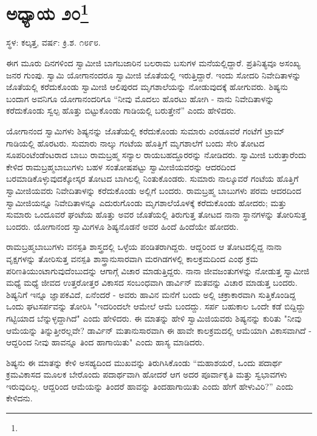 \newpage

\chapter[ಅಧ್ಯಾಯ ೨೦]{ಅಧ್ಯಾಯ ೨೦\protect\footnote{}}

\begin{center}
ಸ್ಥಳ: ಕಲ್ಕತ್ತ, ವರ್ಷ: ಕ್ರಿ.ಶ. ೧೮೯೮.
\end{center}

ಈಗ ಮೂರು ದಿನಗಳಿಂದ ಸ್ವಾಮೀಜಿ ಬಾಗಬಜಾರಿನ ಬಲರಾಮ ಬಸುಗಳ ಮನೆಯಲ್ಲಿದ್ದಾರೆ. ಪ್ರತಿನಿತ್ಯವೂ ಅಸಂಖ್ಯ ಜನರ ಗುಂಪು. ಸ್ವಾಮಿ ಯೋಗಾನಂದರೂ ಸ್ವಾಮೀಜಿ ಜೊತೆಯಲ್ಲಿ ಇರುತ್ತಿದ್ದಾರೆ. ಇಂದು ಸೋದರಿ ನಿವೇದಿತಾಳನ್ನು ಜೊತೆಯಲ್ಲಿ ಕರೆದುಕೊಂಡು ಸ್ವಾಮೀಜಿ ಆಲಿಪುರದ ಮೃಗಶಾಲೆಯನ್ನು ನೋಡುವುದಕ್ಕೆ ಹೋಗುವರು. ಶಿಷ್ಯನು ಬಂದಾಗ ಅವನಿಗೂ ಯೋಗಾನಂದರಿಗೂ “ನೀವು ಮೊದಲು ಹೊರಟು ಹೋಗಿ - ನಾನು ನಿವೇದಿತಾಳನ್ನು ಕರೆದುಕೊಂಡು ಸ್ವಲ್ಪ ಹೊತ್ತು ಬಿಟ್ಟುಕೊಂಡು ಗಾಡಿಯಲ್ಲಿ ಬರುತ್ತೇನೆ” ಎಂದು ಹೇಳಿದರು.

ಯೋಗಾನಂದ ಸ್ವಾಮಿಗಳು ಶಿಷ್ಯನನ್ನು ಜೊತೆಯಲ್ಲಿ ಕರೆದುಕೊಂಡು ಸುಮಾರು ಎರಡೂವರೆ ಗಂಟೆಗೆ ಟ್ರಾಮ್ ಗಾಡಿಯಲ್ಲಿ ಹೊರಟರು. ಸುಮಾರು ನಾಲ್ಕು ಗಂಟೆಯ ಹೊತ್ತಿಗೆ ಮೃಗಶಾಲೆಗೆ ಬಂದು ಸೇರಿ ತೋಟದ ಸೂಪರಿಂಟೆಂಡೆಂಟರಾದ ಬಾಬು ರಾಮಬ್ರಹ್ಮ ಸನ್ಯಾಲ ರಾಯಬಹದ್ದೂರರನ್ನು ನೋಡಿದರು. ಸ್ವಾಮೀಜಿ ಬರುತ್ತಾರೆಂದು ಕೇಳಿದ ರಾಮಬ್ರಹ್ಮಬಾಬುಗಳು ಬಹಳ ಸಂತೋಷಪಟ್ಟು ಸ್ವಾಮೀಜಿಯವರನ್ನು ಆದರದಿಂದ ಬರಮಾಡಿಕೊಳ್ಳುವುದಕ್ಕೋಸ್ಕರ ತೋಟದ ಬಾಗಿಲಲ್ಲಿ ನಿಂತುಕೊಂಡರು. ಸುಮಾರು ನಾಲ್ಕೂವರೆ ಗಂಟೆಯ ಹೊತ್ತಿಗೆ ಸ್ವಾಮೀಜಿಯವರು ನಿವೇದಿತಾಳನ್ನು ಕರೆದುಕೊಂಡು ಅಲ್ಲಿಗೆ ಬಂದರು. ರಾಮಬ್ರಹ್ಮ ಬಾಬುಗಳು ಪರಮ ಆದರದಿಂದ ಸ್ವಾಮೀಜಿಯನ್ನೂ ನಿವೇದಿತಾಳನ್ನೂ ಎದುರುಗೊಂಡು ಮೃಗಶಾಲೆಯೊಳಕ್ಕೆ ಕರೆದುಕೊಂಡು ಹೋದರು; ಮತ್ತು ಸುಮಾರು ಒಂದೂವರೆ ಘಂಟೆಯ ಹೊತ್ತು ಅವರ ಜೊತೆಯಲ್ಲಿ ತಿರುಗುತ್ತ ತೋಟದ ನಾನಾ ಸ್ಥಾನಗಳನ್ನು ತೋರಿಸುತ್ತ ಬಂದರು. ಯೋಗಾನಂದ ಸ್ವಾಮಿಗಳೂ ಶಿಷ್ಯನೊಡನೆ ಅವರ ಹಿಂದೆ ಹಿಂದೆಯೇ ಹೋದರು.

ರಾಮಬ್ರಹ್ಮಬಾಬುಗಳು ವನಸ್ಪತಿ ಶಾಸ್ತ್ರದಲ್ಲಿ ಒಳ್ಳೆಯ ಪಂಡಿತರಾಗಿದ್ದರು. ಆದ್ದರಿಂದ ಆ ತೋಟದಲ್ಲಿದ್ದ ನಾನಾ ವೃಕ್ಷಗಳನ್ನು ತೋರಿಸುತ್ತ ವನಸ್ಪತಿ ಶಾಸ್ತ್ರಾನುಸಾರವಾಗಿ ಮರಗಿಡಗಳಲ್ಲಿ ಕಾಲಕ್ರಮದಿಂದ ಎಂಥ ಕ್ರಮ ಪರಿಣತಿಯುಂಟಾಗುವುದೆಂಬುದನ್ನು ಆಗಾಗ್ಗೆ ವಿಚಾರ ಮಾಡುತ್ತಿದ್ದರು. ನಾನಾ ಜೀವಜಂತುಗಳನ್ನು ನೋಡುತ್ತ ಸ್ವಾಮೀಜಿ ಮಧ್ಯೆ ಮಧ್ಯೆ ಜೀವದ ಉತ್ತರೋತ್ತರ ವಿಕಾಸದ ಸಂಬಂಧವಾಗಿ ಡಾರ್ವಿನ್ ಮತವನ್ನು ವಿಚಾರ ಮಾಡುತ್ತ ಬಂದರು. ಶಿಷ್ಯನಿಗೆ ಇನ್ನೂ ಜ್ಞಾಪಕವಿದೆ, ಏನೆಂದರೆ - ಅವರು ಹಾವಿನ ಮನೆಗೆ ಬಂದು ಅಲ್ಲಿ ಚಕ್ರಾಕಾರವಾಗಿ ಸುತ್ತಿಕೊಂಡಿದ್ದ ಒಂದು ಘಟಸರ್ಪವನ್ನು ತೋರಿಸಿ "ಇದರಿಂದಲೇ ಆಮೇಲೆ ಆಮೆ ಬಂದದ್ದು. ಸರ್ಪ ಬಹುಕಾಲ ಒಂದೇ ಕಡೆ ಬಿದ್ದಿದ್ದು ಗಟ್ಟಿಯಾದ ಬೆನ್ನುಳ್ಳದ್ದಾಗಿದೆ" ಎಂದು ಹೇಳಿದರು. ಈ ಮಾತನ್ನು ಹೇಳಿ ಸ್ವಾಮಿಜಿಯವರು ಶಿಷ್ಯನನ್ನು ಕುರಿತು "ನೀವು ಆಮೆಯನ್ನು ತಿನ್ನುತ್ತೀರಲ್ಲವೇ? ಡಾರ್ವಿನ್ ಮತಾನುಸಾರವಾಗಿ ಈ ಹಾವೇ ಕಾಲಕ್ರಮದಲ್ಲಿ ಆಮೆಯಾಗಿ ವಿಕಾಸವಾಗಿದೆ - ಆದ್ದರಿಂದ ನೀವು ಹಾವನ್ನೂ ತಿಂದ ಹಾಗಾಯಿತು" ಎಂದು ಹಾಸ್ಯ ಮಾಡಿದರು.

ಶಿಷ್ಯನು ಈ ಮಾತನ್ನು ಕೇಳಿ ಅಸಹ್ಯದಿಂದ ಮುಖವನ್ನು ತಿರುಗಿಸಿಕೊಂಡು “ಮಹಾಶಯರೆ, ಒಂದು ಪದಾರ್ಥ ಕ್ರಮವಿಕಾಸದ ಮೂಲಕ ಬೇರೊಂದು ಪದಾರ್ಥವಾಗಿ ಹೋದರೆ ಆಗ ಅದರ ಪೂರ್ವಾಕೃತಿ ಮತ್ತು ಸ್ವಭಾವಗಳು ಇರುವುದಿಲ್ಲ. ಆದ್ದರಿಂದ ಆಮೆಯನ್ನು ತಿಂದರೆ ಹಾವನ್ನು ತಿಂದಹಾಗಾಯಿತು ಎಂದು ಹೇಗೆ ಹೇಳುವಿರಿ?” ಎಂದು ಕೇಳಿದನು.

